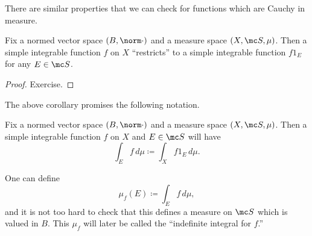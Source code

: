 \documentclass[../notes.tex]{subfiles}
\begin{document}
\begin{remark}
	There are similar properties that we can check for functions which are Cauchy in measure.
\end{remark}
\begin{corollary}
	Fix a normed vector space $(B,\norm\cdot)$ and a measure space $(X,\mc S,\mu)$. Then a simple integrable function $f$ on $X$ ``restricts'' to a simple integrable function $f1_E$ for any $E\in\mc S$.
\end{corollary}
\begin{proof}
	Exercise.
\end{proof}
The above corollary promises the following notation.
\begin{notation}
	Fix a normed vector space $(B,\norm\cdot)$ and a measure space $(X,\mc S,\mu)$. Then a simple integrable function $f$ on $X$ and $E\in\mc S$ will have
	\[\int_Ef\,d\mu\coloneqq\int_Xf1_E\,d\mu.\]
\end{notation}
\begin{remark}
	One can define
	\[\mu_f(E)\coloneqq\int_Ef\,d\mu,\]
	and it is not too hard to check that this defines a measure on $\mc S$ which is valued in $B$. This $\mu_f$ will later be called the ``indefinite integral for $f$.''
\end{remark}
\end{document}
